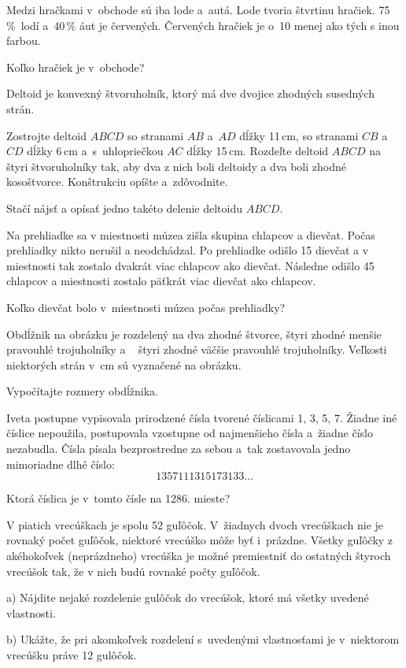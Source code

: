 {%
Medzi hračkami v~obchode sú iba lode a~autá.
Lode tvoria štvrtinu hračiek.
75\,\%~lodí a~40\,\% áut je červených.
Červených hračiek je o~10 menej ako tých s inou farbou.

Koľko hračiek je v~obchode?}

{%
Deltoid je konvexný štvoruholník, ktorý má dve dvojice zhodných susedných strán.

Zostrojte deltoid $ABCD$ so stranami $AB$ a~$AD$ dĺžky 11\,cm, so stranami $CB$ a~$CD$ dĺžky 6\,cm a~s~uhlopriečkou $AC$ dĺžky 15\,cm.
Rozdeľte deltoid $ABCD$ na štyri štvoruholníky tak, aby dva z nich boli deltoidy a dva boli zhodné kosoštvorce.
Konštrukciu opíšte a~zdôvodnite.

\poznamka
Stačí nájsť a opísať jedno takéto delenie deltoidu $ABCD$.}

{%
Na prehliadke sa v miestnosti múzea zišla skupina chlapcov a dievčat.
Počas prehliadky nikto nerušil a neodchádzal.
Po prehliadke odišlo 15 dievčat a v miestnosti tak zostalo dvakrát viac chlapcov ako dievčat.
Následne odišlo 45 chlapcov a miestnosti zostalo päťkrát viac dievčat ako chlapcov.

Koľko dievčat bolo v~miestnosti múzea počas prehliadky?}

{%
Obdĺžnik na obrázku je rozdelený na dva zhodné štvorce, štyri zhodné menšie pravouhlé trojuholníky a ~ štyri zhodné väčšie pravouhlé trojuholníky.
Veľkosti niektorých strán v~cm sú vyznačené na obrázku.

Vypočítajte rozmery obdĺžnika.
%
}

{%
Iveta postupne vypisovala prirodzené čísla tvorené číslicami 1, 3, 5, 7.
Žiadne iné číslice nepoužila, postupovala vzostupne od najmenšieho čísla a~žiadne číslo nezabudla.
Čísla písala bezprostredne za sebou a~tak zostavovala jedno mimoriadne dlhé číslo:
$$
1357111315173133\dots
$$

Ktorá číslica je v~tomto čísle na 1286. mieste?}

{%
V piatich vrecúškach je spolu 52 guľôčok.
V~žiadnych dvoch vrecúškach nie je rovnaký počet guľôčok, niektoré vrecúško môže byť i~prázdne.
Všetky guľôčky z akéhokoľvek (neprázdneho) vrecúška je možné premiestniť do ostatných štyroch vrecúšok tak, že v nich budú rovnaké počty guľôčok.
\item{a)} Nájdite nejaké rozdelenie gulôčok do vrecúšok, ktoré má všetky uvedené vlastnosti.
\item{b)} Ukážte, že pri akomkoľvek rozdelení s~uvedenými vlastnosťami je v~niektorom vrecúšku práve 12 gulôčok.\endgraf}

